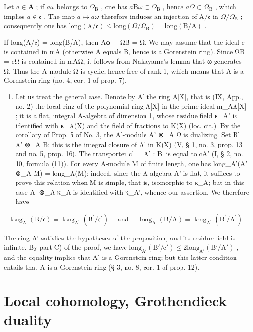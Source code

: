 Let \(a \in \mathbf{A}\) ; if \(a\omega\) belongs to \(\Omega_{\mathrm{B}}\) , one has \(a\mathrm{B}\omega \subset \Omega_{\mathrm{B}}\) , hence \(a\Omega \subset \Omega_{\mathrm{B}}\) , which implies \(a \in \mathfrak{c}\) . The map \(a \mapsto a\omega\) therefore induces an injection of \(\mathrm{A}/\mathfrak{c}\) in \(\Omega/\Omega_{\mathrm{B}}\) ; consequently one has \(\mathrm{long}(\mathrm{A}/\mathfrak{c}) \leqslant \mathrm{long}(\Omega/\Omega_{\mathrm{B}}) = \mathrm{long}(\mathrm{B}/\mathrm{A})\) .

If long(A/c) = long(B/A), then Aω + ΩB = Ω. We may assume that the ideal c is contained in mA (otherwise A equals B, hence is a Gorenstein ring). Since ΩB = cΩ is contained in mAΩ, it follows from Nakayama's lemma that ω generates Ω. Thus the A-module Ω is cyclic, hence free of rank 1, which means that A is a Gorenstein ring (no. 4, cor. 1 of prop. 7).

\begin{enumerate}
\def\labelenumi{\Alph{enumi})}
\setcounter{enumi}{3}
\tightlist
\item
  Let us treat the general case. Denote by A' the ring A{]}X{[}, that is (IX, App., no. 2) the local ring of the polynomial ring Λ{[}X{]} in the prime ideal m\_AΛ{[}X{]} ; it is a flat, integral A-algebra of dimension 1, whose residue field κ\_A' is identified with κ\_A(X) and the field of fractions to K(X) (loc. cit.). By the corollary of Prop. 5 of No. 3, the A'-module A' ⊗\_A Ω is dualizing. Set B' = A' ⊗\_A B; this is the integral closure of Λ' in K(X) (V, § 1, no. 3, prop. 13 and no. 5, prop. 16). The transporter c' = A' : B' is equal to cA' (I, § 2, no. 10, formula (11)). For every A-module M of finite length, one has long\_A'(A' ⊗\_A M) = long\_A(M): indeed, since the A-algebra A' is flat, it suffices to prove this relation when M is simple, that is, isomorphic to κ\_A; but in this case A' ⊗\_A κ\_A is identified with κ\_A′, whence our assertion. We therefore have
\end{enumerate}

\[
\operatorname{long} _ {\mathrm{A}} (\mathrm{B} / \mathfrak {c}) = \operatorname{long} _ {\mathrm{A} ^ {\prime}} \left(\mathrm{B} ^ {\prime} / \mathfrak {c} ^ {\prime}\right) \quad \text { and } \quad \operatorname{long} _ {\mathrm{A}} (\mathrm{B} / \mathrm{A}) = \operatorname{long} _ {\mathrm{A} ^ {\prime}} \left(\mathrm{B} ^ {\prime} / \mathrm{A} ^ {\prime}\right).
\]

The ring A' satisfies the hypotheses of the proposition, and its residue field is infinite. By part C) of the proof, we have \(\text{long}_{\text{A}'}(\text{B}'/\text{c}') \leqslant 2 \text{long}_{\text{A}'}(\text{B}'/\text{A}')\) , and the equality implies that A' is a Gorenstein ring; but this latter condition entails that A is a Gorenstein ring (§ 3, no. 8, cor. 1 of prop. 12).

\section{Local cohomology, Grothendieck duality}
